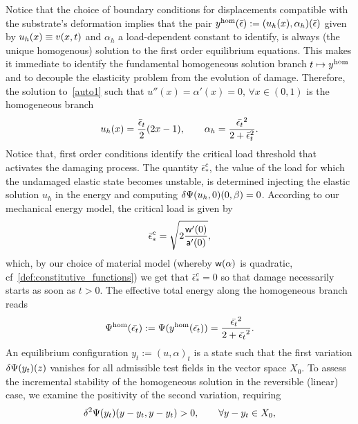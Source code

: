 Notice that the choice of boundary conditions for displacements compatible with the substrate's deformation implies that the pair $y^{\text{hom}}(\bar\epsilon):=(u_h(x), \alpha_h)(\bar\epsilon)$ given by $u_h(x)\equiv v(x, t)$ and $\alpha_h$ a load-dependent constant to identify, is always (the unique homogenous) solution to the first order equilibrium equations. This makes it immediate to identify the fundamental homogeneous solution branch $t \mapsto y^{\text{hom}}$ and to decouple the elasticity problem from the  evolution of damage.
Therefore, the solution to~\eqref{auto1} such that $u''(x)=\alpha'(x)= 0, \, \forall x\in (0, 1)$ is the homogeneous branch
\begin{equation}
    u_h(x) =  \frac{\bar \epsilon_t}{2}(2x-1),\qquad\alpha_h = \frac{\Bar{\epsilon_t}^2}{2 + \Bar\epsilon_t^2}\label{eq:homo1}.
\end{equation}
Notice that,
first order conditions identify the critical load threshold that activates the damaging process. The quantity $\bar\epsilon_*^c$, the value of the load for which the undamaged elastic state becomes unstable, is determined injecting the elastic solution $u_h$ in the energy and computing $\delta \Psi(u_h, 0)(0, \beta)=0$.
According to our mechanical energy model, the critical load is given by
\begin{equation}
    {{{\bar{\epsilon}^c}_*}} = \sqrt{2\frac{\mathsf{w}'(0)}{\mathsf{a}'(0)}},
\end{equation}
% 
which, by our choice of material model (whereby $\mathsf{w}(\alpha)$ is quadratic, cf~\eqref{def:constitutive_functions}) we get that $\bar{\epsilon}^c_*=0$ so that damage necessarily starts as soon as $t>0$.
The effective {total} energy along the {homogeneous} branch reads
\begin{equation}
    \label{eq:energy_homogeneous}
    \Psi^\text{hom}(\Bar{\epsilon_t}) :=\Psi(y^{\text{hom}}(\Bar{\epsilon_t})) = \frac{\Bar{\epsilon_t}^2}{2 + \Bar{\epsilon_t}^2}.
\end{equation}
An equilibrium configuration $y_t:=(u,\alpha)_t$ is a state such that the first variation $\delta \Psi(y_t)(z)$ vanishes for all admissible test fields in the vector space $X_0$.
To assess the incremental stability of the homogeneous solution in the reversible (linear) case, we examine the positivity of the second variation, requiring
\begin{equation}
    \delta^2 \Psi(y_t)(y-y_t, y-y_t)>0, \qquad  \forall {y-y_t}\in X_0,
    \label{eqn:linear_second_order_stability}
\end{equation}

